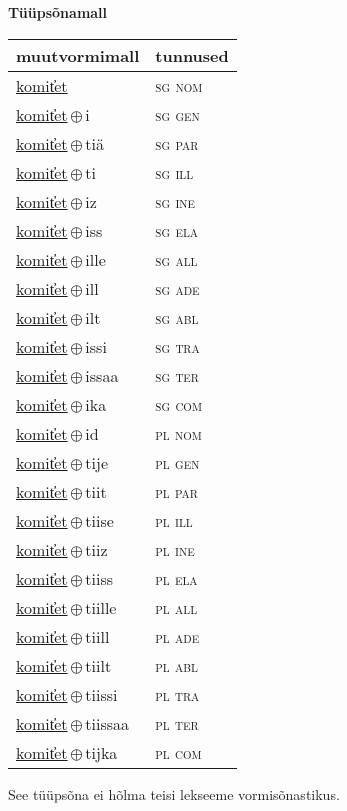 

\vspace{3.5em}
\noindent \begin{minipage}{\textwidth}
\noindent \textbf{Tüüpsõnamall \,}\\

\begin{sideways}
\begin{tabular}{l l}
muutvormimall & tunnused \\
\hline
\underline{komit̕et} & \textsc{ sg nom } \\
\underline{komit̕et}\,$\oplus$\,i & \textsc{ sg gen } \\
\underline{komit̕et}\,$\oplus$\,tiä & \textsc{ sg par } \\
\underline{komit̕et}\,$\oplus$\,ti & \textsc{ sg ill } \\
\underline{komit̕et}\,$\oplus$\,iz & \textsc{ sg ine } \\
\underline{komit̕et}\,$\oplus$\,iss & \textsc{ sg ela } \\
\underline{komit̕et}\,$\oplus$\,ille & \textsc{ sg all } \\
\underline{komit̕et}\,$\oplus$\,ill & \textsc{ sg ade } \\
\underline{komit̕et}\,$\oplus$\,ilt & \textsc{ sg abl } \\
\underline{komit̕et}\,$\oplus$\,issi & \textsc{ sg tra } \\
\underline{komit̕et}\,$\oplus$\,issaa & \textsc{ sg ter } \\
\underline{komit̕et}\,$\oplus$\,ika & \textsc{ sg com } \\
\underline{komit̕et}\,$\oplus$\,id & \textsc{ pl nom } \\
\underline{komit̕et}\,$\oplus$\,tije & \textsc{ pl gen } \\
\underline{komit̕et}\,$\oplus$\,tiit & \textsc{ pl par } \\
\underline{komit̕et}\,$\oplus$\,tiise & \textsc{ pl ill } \\
\underline{komit̕et}\,$\oplus$\,tiiz & \textsc{ pl ine } \\
\underline{komit̕et}\,$\oplus$\,tiiss & \textsc{ pl ela } \\
\underline{komit̕et}\,$\oplus$\,tiille & \textsc{ pl all } \\
\underline{komit̕et}\,$\oplus$\,tiill & \textsc{ pl ade } \\
\underline{komit̕et}\,$\oplus$\,tiilt & \textsc{ pl abl } \\
\underline{komit̕et}\,$\oplus$\,tiissi & \textsc{ pl tra } \\
\underline{komit̕et}\,$\oplus$\,tiissaa & \textsc{ pl ter } \\
\underline{komit̕et}\,$\oplus$\,tijka & \textsc{ pl com } \\
\end{tabular}
\end{sideways}
\label{tab:tüüpsõnamall-komit̕et}

\end{minipage}

 
\vspace{1em}
\noindent See tüüpsõna ei hõlma teisi lekseeme vormi\-sõnastikus.
